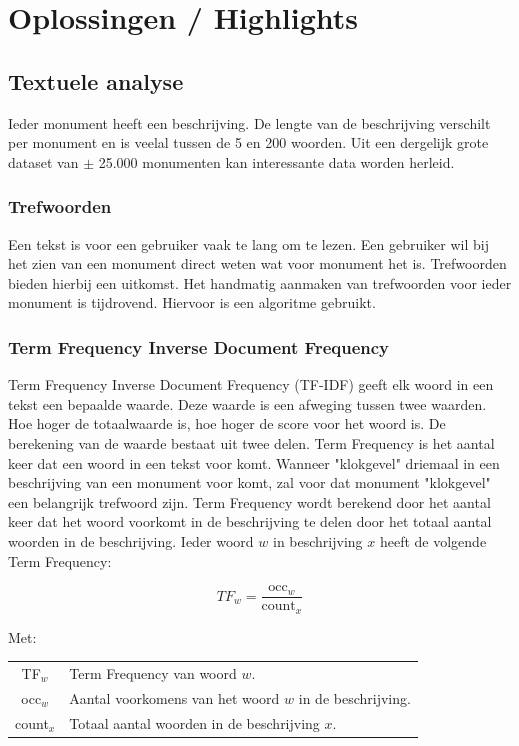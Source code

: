 \documentclass[a4paper,10pt]{article}
\begin{document}
%
%
%
%
\section{Oplossingen / Highlights}
	\subsection{Textuele analyse}
	Ieder monument heeft een beschrijving. De lengte van de beschrijving verschilt per monument en is veelal tussen de 5 en 200 woorden. Uit een dergelijk grote dataset van $\pm$ 25.000 monumenten kan interessante data worden herleid.

		\subsubsection{Trefwoorden}
		Een tekst is voor een gebruiker vaak te lang om te lezen. Een gebruiker wil bij het zien van een monument direct weten wat voor monument het is. Trefwoorden bieden hierbij een uitkomst. Het handmatig aanmaken van trefwoorden voor ieder monument is tijdrovend. Hiervoor is een algoritme gebruikt.
		
		\subsubsection{Term Frequency Inverse Document Frequency}
		Term Frequency Inverse Document Frequency (TF-IDF) geeft elk woord in een tekst een bepaalde waarde. Deze waarde is een afweging tussen twee waarden. Hoe hoger de totaalwaarde is, hoe hoger de score voor het woord is. De berekening van de waarde bestaat uit twee delen. Term Frequency is het aantal keer dat een woord in een tekst voor komt. Wanneer "klokgevel" driemaal in een beschrijving van een monument voor komt, zal voor dat monument "klokgevel" een belangrijk trefwoord zijn. Term Frequency wordt berekend door het aantal keer dat het woord voorkomt in de beschrijving te delen door het totaal aantal woorden in de beschrijving. Ieder woord $w$ in beschrijving $x$ heeft de volgende Term Frequency:
		
		\begin{equation}
			TF_w = \frac{\text{occ}_w}{\text{count}_x}
		\end{equation}
		
		\noindent Met:
		\begin{center}
			\begin{tabular}{ c | l }
				TF$_w$ & Term Frequency van woord $w$. \\
			  	occ$_w$ & Aantal voorkomens van het woord $w$ in de beschrijving. \\
			  	count$_x$ & Totaal aantal woorden in de beschrijving $x$. 
			\end{tabular}
		\end{center}
		
\end{document}
